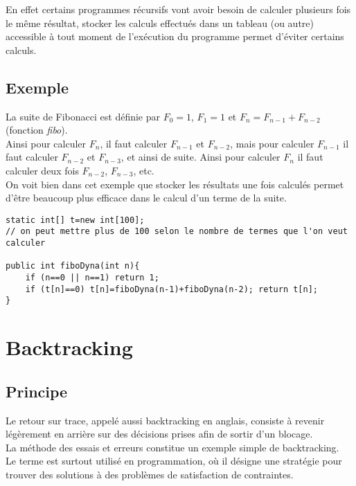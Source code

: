 \documentclass[a4paper,10pt]{book} %
\begin{document}
En effet certains programmes récursifs vont avoir besoin de calculer plusieurs fois le même résultat, stocker les calculs effectués dans un tableau (ou autre) accessible à tout moment de l’exécution du programme permet d'éviter certains calculs.

\subsection{Exemple}
La suite de Fibonacci est définie par $F_0=1$, $F_1=1$ et $F_n=F_{n-1}+F_{n-2}$ (fonction \textit{fibo}).\\

Ainsi pour calculer $F_n$, il faut calculer $F_{n-1}$ et $F_{n-2}$, mais pour calculer $F_{n-1}$ il faut calculer $F_{n-2}$ et $F_{n-3}$, et ainsi de suite. Ainsi pour calculer $F_n$ il faut calculer deux fois $F_{n-2}$, $F_{n-3}$, etc. \\

On voit bien dans cet exemple que stocker les résultats une fois calculés permet d'être beaucoup plus efficace dans le calcul d'un terme de la suite.

\begin{lstlisting}
static int[] t=new int[100]; 
// on peut mettre plus de 100 selon le nombre de termes que l'on veut calculer

public int fiboDyna(int n){
	if (n==0 || n==1) return 1; 
	if (t[n]==0) t[n]=fiboDyna(n-1)+fiboDyna(n-2); return t[n];
}
\end{lstlisting}

\section{Backtracking}
\subsection{Principe}
Le retour sur trace, appelé aussi backtracking en anglais, consiste à revenir légèrement en arrière sur des décisions prises afin de sortir d'un blocage.\\

La méthode des essais et erreurs constitue un exemple simple de backtracking.\\

Le terme est surtout utilisé en programmation, où il désigne une stratégie pour trouver des solutions à des problèmes de satisfaction de contraintes.
\end{document}
